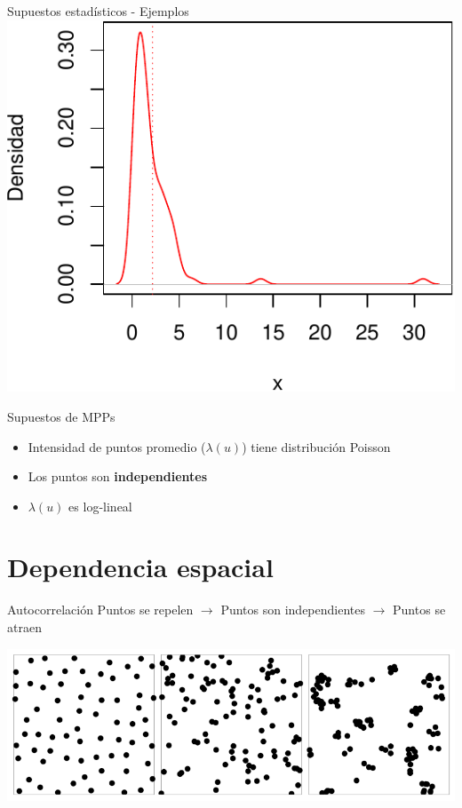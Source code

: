 \documentclass[
  11pt,
  ignorenonframetext,
]{beamer}
\providecommand{\tightlist}{%
  \setlength{\itemsep}{0pt}\setlength{\parskip}{0pt}}
\begin{document}
\begin{frame}{Supuestos estadísticos - Ejemplos}
\protect\hypertarget{supuestos-estaduxedsticos---ejemplos-1}{}
\includegraphics{Particularidades_files/figure-beamer/unnamed-chunk-3-1}
\end{frame}

\begin{frame}{Supuestos de MPPs}
\protect\hypertarget{supuestos-de-mpps}{}
\begin{itemize}
\tightlist
\item
  Intensidad de puntos promedio (\(\lambda(u)\)) tiene distribución
  Poisson
\item
  Los puntos son \textbf{independientes}
\item
  \(\lambda(u)\) es log-lineal
\end{itemize}
\end{frame}

\hypertarget{dependencia-espacial}{%
\section{Dependencia espacial}\label{dependencia-espacial}}

\begin{frame}{Autocorrelación}
\protect\hypertarget{autocorrelaciuxf3n}{}
Puntos se repelen \(\rightarrow\) Puntos son independientes
\(\rightarrow\) Puntos se atraen

\includegraphics{Figuras/Ejemplo-procesos.png}
\end{frame}
\end{document}
